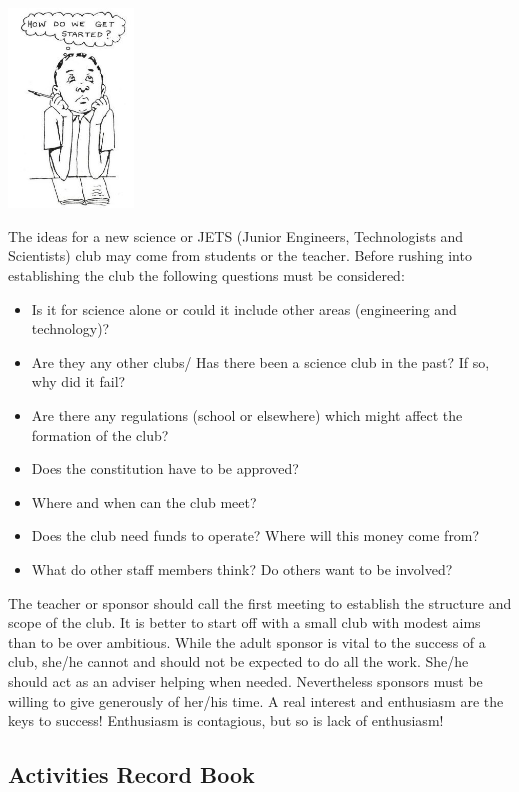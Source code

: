 \begin{multicols}{2}
\begin{center}
\includegraphics[width=0.25\textwidth]{./img/source/organizing-club.jpg}
\end{center}

The ideas for a new science or JETS (Junior
Engineers, Technologists and Scientists) club
may come from students or the teacher. Before
rushing into establishing the club the following
questions must be considered:

\begin{itemize}
\item Is it for science alone
or could it include other areas (engineering and
technology)?
\item Are they any other clubs/ Has
there been a science club in the past? If so, why
did it fail?
\item Are there any regulations (school or
elsewhere) which might affect the formation of
the club?
\item Does the constitution have to be
approved?
\item Where and when can the club meet?
\item Does the club need funds to operate? Where will
this money come from?
\item What do other staff
members think? Do others want to be involved?
\end{itemize}

The teacher or sponsor should call the first
meeting to establish the structure and scope of
the club. It is better to start off with a small club
with modest aims than to be over ambitious.
While the adult sponsor is vital to the success of
a club, she/he cannot and should not be expected
to do all the work. She/he should act as an
adviser helping when needed. Nevertheless
sponsors must be willing to give generously of
her/his time. A real interest and enthusiasm are
the keys to success! Enthusiasm is contagious,
but so is lack of enthusiasm!

\subsection{Activities Record Book}


\end{multicols}
